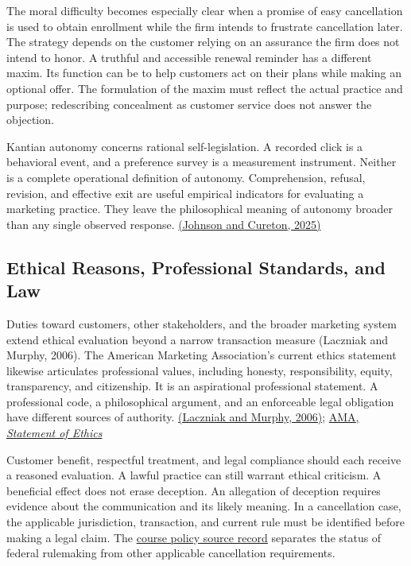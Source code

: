 The moral difficulty becomes especially clear when a promise of easy
cancellation is used to obtain enrollment while the firm intends to
frustrate cancellation later. The strategy depends on the customer
relying on an assurance the firm does not intend to honor. A truthful
and accessible renewal reminder has a different maxim. Its function can
be to help customers act on their plans while making an optional offer.
The formulation of the maxim must reflect the actual practice and
purpose; redescribing concealment as customer service does not answer
the objection.

Kantian autonomy concerns rational self-legislation. A recorded click is
a behavioral event, and a preference survey is a measurement instrument.
Neither is a complete operational definition of autonomy. Comprehension,
refusal, revision, and effective exit are useful empirical indicators
for evaluating a marketing practice. They leave the philosophical
meaning of autonomy broader than any single observed response.
\href{https://plato.stanford.edu/entries/kant-moral/}{(Johnson and
Cureton, 2025)}

\hypertarget{M09-ethical-reasons-professional-standards-and-law}{%
\subsection{Ethical Reasons, Professional Standards, and
Law}\label{M09-ethical-reasons-professional-standards-and-law}}

\noindent \noindent Duties toward customers, other stakeholders, and the broader
marketing system extend ethical evaluation beyond a narrow transaction
measure (Laczniak and Murphy, 2006). The American Marketing
Association's current ethics statement likewise articulates professional
values, including honesty, responsibility, equity, transparency, and
citizenship. It is an aspirational professional statement. A
professional code, a philosophical argument, and an enforceable legal
obligation have different sources of authority.
\href{https://epublications.marquette.edu/market_fac/45/}{(Laczniak and
Murphy, 2006)}; \href{https://www.ama.org/ama-statement-of-ethics/}{AMA,
\emph{Statement of Ethics}}

Customer benefit, respectful treatment, and legal compliance should each
receive a reasoned evaluation. A lawful practice can still warrant
ethical criticism. A beneficial effect does not erase deception. An
allegation of deception requires evidence about the communication and
its likely meaning. In a cancellation case, the applicable jurisdiction,
transaction, and current rule must be identified before making a legal
claim. The
\href{../01_Resources/13_Consumer_Agency_and_Recent_Research/Policy/README.md}{course
policy source record} separates the status of federal rulemaking from
other applicable cancellation requirements.

